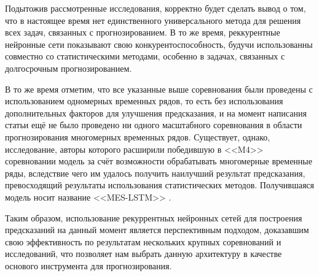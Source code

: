     Подытожив рассмотренные исследования, корректно будет сделать вывод о том, что в настоящее время нет единственного универсального метода для решения всех задач, связанных с прогнозированием. В то же время, реккурентные нейронные сети показывают свою конкурентоспособность, будучи использованны совместно со статистическими методами, особенно в задачах, связанных с долгосрочным прогнозированием.

    В то же время отметим, что все указанные выше соревнования были проведены с использованием одномерных временных рядов, то есть без использования дополнительных факторов для улучшения предсказания, и на момент написания статьи ещё не было проведено ни одного масштабного соревнования в области прогнозирования многомерных временных рядов. Существует, однако, исследование, авторы которого расширили победившую в <<M4>> соревновании модель за счёт возможности обрабатывать многомерные временные ряды, вследствие чего им удалось получить наилучший результат предсказания, превосходящий результаты использования статистических методов. Получившаяся модель носит название <<MES-LSTM>> \cite{MES_RNN}.

    Таким образом, использование рекуррентных нейронных сетей для построения предсказаний на данный момент является перспективным подходом, доказавшим свою эффективность по результатам нескольких крупных соревнований и исследований, что позволяет нам выбрать данную архитектуру в качестве основого инструмента для прогнозирования.  
    


\endinput
